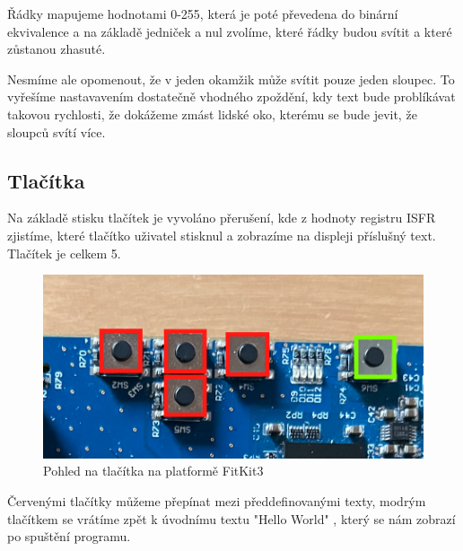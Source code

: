 \documentclass[a4paper, 11pt]{article}
\begin{document}
\noindent Řádky mapujeme hodnotami 0-255, která je poté převedena do binární ekvivalence a na základě jedniček a nul zvolíme, které řádky budou svítit a které zůstanou zhasuté.

\noindent Nesmíme ale opomenout, že v jeden okamžik může svítit pouze jeden sloupec. To vyřešíme nastavavením dostatečně vhodného zpoždění, kdy text bude problíkávat takovou rychlosti, že dokážeme zmást lidské oko, kterému se bude jevit, že sloupců svítí více.


\subsection{Tlačítka}
Na základě stisku tlačítek je vyvoláno přerušení, kde z hodnoty registru ISFR zjistíme, které tlačítko uživatel stisknul a zobrazíme na displeji příslušný text. Tlačítek je celkem 5.

\begin{figure}[!htb]
    \centering
    \includegraphics[scale=0.3]{buttons.png}
    \caption{Pohled na tlačítka na platformě FitKit3}
    \label{fig:my_label}
\end{figure}

\noindent Červenými tlačítky můžeme přepínat mezi předdefinovanými texty, modrým tlačítkem se vrátíme zpět k úvodnímu textu "Hello World" , který se nám zobrazí po spuštění programu.
\end{document}
